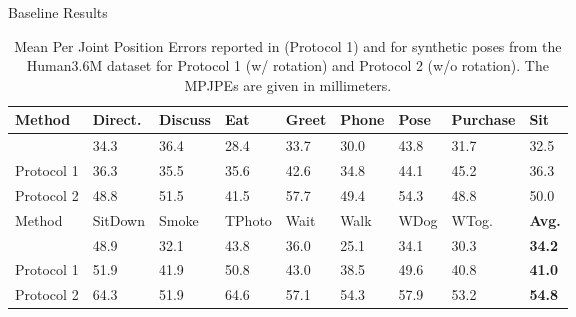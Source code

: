 \documentclass[8pt]{beamer}
\begin{document}
	\begin{frame}{Baseline Results}
		\begin{table}
			\centering
			\begin{tabularx}{\textwidth}{l *{8}{Y}}
				\toprule
				Method & Direct. & Discuss & Eat & Greet & Phone & Pose & Purchase & Sit \\
				\midrule
				\citet{drover18} & 34.3 & 36.4 & 28.4 & 33.7 & 30.0 & 43.8 & 31.7 & 32.5\\
				Protocol 1 & 36.3 & 35.5 & 35.6 & 42.6 & 34.8 & 44.1 & 45.2 & 36.3 \\
				Protocol 2 & 48.8 & 51.5 & 41.5 & 57.7 & 49.4 & 54.3 & 48.8 & 50.0 \\
				\bottomrule
				\toprule
				Method & SitDown & Smoke & TPhoto & Wait & Walk & WDog & WTog. & \textbf{Avg.}\\
				\midrule
				\citet{drover18} & 48.9 & 32.1 & 43.8 & 36.0 & 25.1 & 34.1 & 30.3 & \textbf{34.2}\\
				Protocol 1  & 51.9 & 41.9 & 50.8 & 43.0 & 38.5 & 49.6 & 40.8 & \textbf{41.0} \\
				Protocol 2 & 64.3 & 51.9 & 64.6 & 57.1 & 54.3 & 57.9 & 53.2 & \textbf{54.8} \\
				\bottomrule
			\end{tabularx}
		\caption{Mean Per Joint Position Errors reported in \cite{drover18} (Protocol 1) and for synthetic poses from the Human3.6M dataset for Protocol 1 (w/ rotation)  and Protocol 2 (w/o rotation). 
			The MPJPEs are given in millimeters.}
		\end{table}
	\end{frame}
\end{document}
